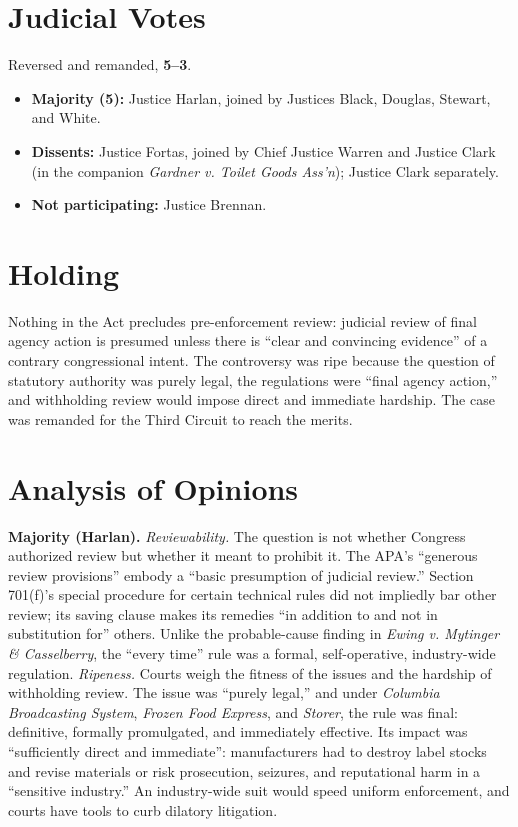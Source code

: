 \documentclass[12pt]{article}
\begin{document}
\section{Judicial Votes}

Reversed and remanded, \textbf{5--3}.
\begin{itemize}
\item \textbf{Majority (5):} Justice Harlan, joined by Justices Black, Douglas, Stewart, and White.
\item \textbf{Dissents:} Justice Fortas, joined by Chief Justice Warren and Justice Clark (in the companion \textit{Gardner v. Toilet Goods Ass'n}); Justice Clark separately.
\item \textbf{Not participating:} Justice Brennan.
\end{itemize}

\section{Holding}

Nothing in the Act precludes pre-enforcement review: judicial review of final agency action is presumed unless there is ``clear and convincing evidence'' of a contrary congressional intent. The controversy was ripe because the question of statutory authority was purely legal, the regulations were ``final agency action,'' and withholding review would impose direct and immediate hardship. The case was remanded for the Third Circuit to reach the merits.

\section{Analysis of Opinions}

\textbf{Majority (Harlan).} \emph{Reviewability.} The question is not whether Congress authorized review but whether it meant to prohibit it. The APA's ``generous review provisions'' embody a ``basic presumption of judicial review.'' Section 701(f)'s special procedure for certain technical rules did not impliedly bar other review; its saving clause makes its remedies ``in addition to and not in substitution for'' others. Unlike the probable-cause finding in \textit{Ewing v. Mytinger \& Casselberry}, the ``every time'' rule was a formal, self-operative, industry-wide regulation. \emph{Ripeness.} Courts weigh the fitness of the issues and the hardship of withholding review. The issue was ``purely legal,'' and under \textit{Columbia Broadcasting System}, \textit{Frozen Food Express}, and \textit{Storer}, the rule was final: definitive, formally promulgated, and immediately effective. Its impact was ``sufficiently direct and immediate'': manufacturers had to destroy label stocks and revise materials or risk prosecution, seizures, and reputational harm in a ``sensitive industry.'' An industry-wide suit would speed uniform enforcement, and courts have tools to curb dilatory litigation.
\end{document}
